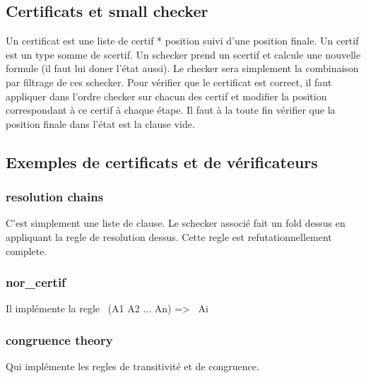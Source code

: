 \subsection{Certificats et small checker}
Un certificat est une liste de certif * position suivi d'une position finale.
Un certif est un type somme de scertif.
Un schecker prend un scertif et calcule une nouvelle formule (il faut lui doner l'état aussi).
Le checker sera simplement la combinaison par filtrage de ces schecker.
Pour vérifier que le certificat est correct, il faut appliquer dans l'ordre checker sur
chacun des certif et modifier la position correspondant à ce certif à chaque étape.
Il faut à la toute fin vérifier que la position finale dans l'état est la clause vide.

\subsection{Exemples de certificats et de vérificateurs}
\subsubsection{resolution chains}
C'est simplement une liste de clause.
Le schecker associé fait un fold dessus en appliquant la regle de resolution dessus. Cette regle est
refutationnellement complete.

\subsubsection{nor\_certif}
Il implémente la regle ~(A1 \/ A2 \/ ... \/ An) => ~Ai

\subsubsection{congruence theory}
Qui implémente les regles de transitivité et de congruence.




